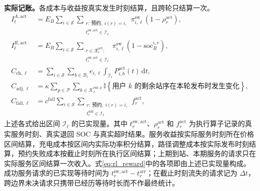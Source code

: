 \documentclass[12pt,a4paper,UTF8]{ctexart}
\begin{document}
\textbf{实际记账。}各成本与收益按真实发生时刻结算，且跨轮只结算一次。
\begin{align}
I_\ell^{A,\mathrm{act}}
&=E_B\sum_{i\in\mathcal S}
\sum_{\substack{r:\ \text{预约},\ i(r)=i,\\
t_r^{\mathrm{sw,act}}\in\mathcal I_\ell}}
\pi_{i,\ell}^{\mathrm{sw}}
(1-\rho_r^{\mathrm{act}}),
\label{eq:realized_reservation_income}\\
I_\ell^{R,\mathrm{act}}
&=E_B\sum_{i\in\mathcal S}
\sum_{\substack{r\in\mathcal R_{i}^{\mathrm{act}}:\\
t_r^{\mathrm{sw,act}}\in\mathcal I_\ell}}
\pi_{i,\ell}^{\mathrm{sw}}
(1-\mathrm{soc}_R^{i,r}),
\label{eq:realized_random_income}\\
C_{\mathrm{ch},\ell}
&=\sum_{i\in\mathcal S}\sum_{b\in\mathcal B_i}
e_{i,\ell}
\int_{\mathcal I_\ell}P_{i,b}^{\mathrm{act}}(t)\,\mathrm dt,
\label{eq:realized_charging_cost}\\
C_{\mathrm{adj},\ell}
&=\kappa\sum_{p\in\mathcal P}
\sum_{k\in\mathcal K_\ell^{\mathrm{enr},p}}
\mathbb I\!\left\{
\text{用户 }k\text{ 的剩余站序在本轮发布时发生变化}
\right\},
\label{eq:realized_adjustment_cost}\\
C_{\mathrm{fail},\ell}
&=c^{\mathrm{fail}}\sum_{i\in\mathcal S}
\sum_{\substack{r:\ \text{预约},\ i(r)=i,\\
t_r^{\mathrm{ddl}}\in\mathcal I_\ell}}
f_r^{\mathrm{act}},
\label{eq:realized_reservation_failure_cost}
\end{align}
上述各式给出区间 $\mathcal I_\ell$ 的已实现量。其中 $t_r^{\mathrm{sw,act}}$、$\rho_r^{\mathrm{act}}$ 和 $f_r^{\mathrm{act}}$ 为执行算子记录的真实服务时刻、真实退回 SOC 与真实超时结果。服务收益按实际服务时刻所在价格区间结算，充电成本按区间内实际功率积分结算，路径调整成本按实际发布时刻结算，预约失败成本按截止时刻所在执行区间结算；上期到站、本期服务的请求只在实际服务区间结算一次收入。式\eqref{eq:rl_reward}中的各项即由上述已实现量构成。成功服务请求的已实现等待时间为 $t_r^{\mathrm{sw,act}}-t_r^{\mathrm{arr}}$；在截止时刻流失的请求记为 $\Delta t$，跨边界未决请求只携带已经历等待时长而不作最终统计。


\end{document}
